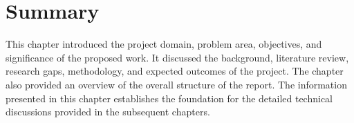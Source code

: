 \section[Summary]{\textbf{Summary}}
This chapter introduced the project domain, problem area, objectives, and significance of the
proposed work. It discussed the background, literature review, research gaps, methodology,
and expected outcomes of the project. The chapter also provided an overview of the overall
structure of the report. The information presented in this chapter establishes the foundation
for the detailed technical discussions provided in the subsequent chapters.










